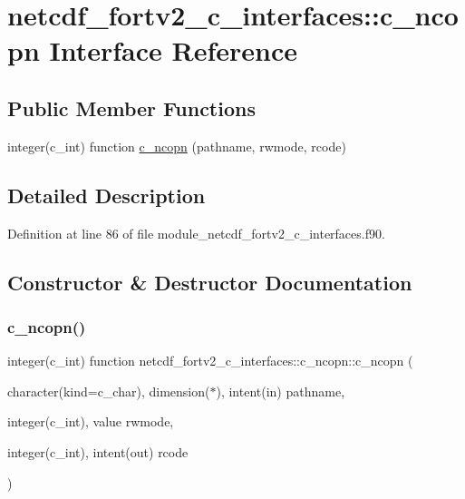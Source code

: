 \hypertarget{interfacenetcdf__fortv2__c__interfaces_1_1c__ncopn}{}\section{netcdf\+\_\+fortv2\+\_\+c\+\_\+interfaces\+:\+:c\+\_\+ncopn Interface Reference}
\label{interfacenetcdf__fortv2__c__interfaces_1_1c__ncopn}
\subsection*{Public Member Functions}
\begin{DoxyCompactItemize}
\item 
integer(c\+\_\+int) function \hyperlink{interfacenetcdf__fortv2__c__interfaces_1_1c__ncopn_a46c70a2429c5ff4baedf376a7b5e99dd}{c\+\_\+ncopn} (pathname, rwmode, rcode)
\end{DoxyCompactItemize}


\subsection{Detailed Description}


Definition at line 86 of file module\+\_\+netcdf\+\_\+fortv2\+\_\+c\+\_\+interfaces.\+f90.



\subsection{Constructor \& Destructor Documentation}
\mbox{\label{interfacenetcdf__fortv2__c__interfaces_1_1c__ncopn_a46c70a2429c5ff4baedf376a7b5e99dd}} 
\subsubsection{\texorpdfstring{c\+\_\+ncopn()}{c\_ncopn()}}
{\footnotesize\ttfamily integer(c\+\_\+int) function netcdf\+\_\+fortv2\+\_\+c\+\_\+interfaces\+::c\+\_\+ncopn\+::c\+\_\+ncopn (\begin{DoxyParamCaption}\item[{character(kind=c\+\_\+char), dimension($\ast$), intent(in)}]{pathname,  }\item[{integer(c\+\_\+int), value}]{rwmode,  }\item[{integer(c\+\_\+int), intent(out)}]{rcode }\end{DoxyParamCaption})}



